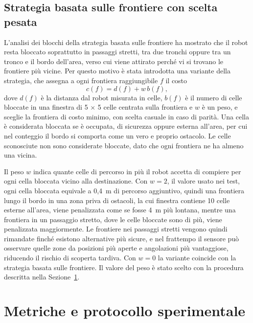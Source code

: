\subsection{Strategia basata sulle frontiere con scelta pesata}
\label{sec:pesata}

L'analisi dei blocchi della strategia basata sulle frontiere ha mostrato che il robot resta bloccato soprattutto in passaggi stretti, tra due tronchi oppure tra un tronco e il bordo dell'area, verso cui viene attirato perché vi si trovano le frontiere più vicine. Per questo motivo è stata introdotta una variante della strategia, che assegna a ogni frontiera raggiungibile $f$ il costo
\begin{equation}
    c(f) = d(f) + w \, b(f),
    \label{eq:costo}
\end{equation}
dove $d(f)$ è la distanza dal robot misurata in celle, $b(f)$ è il numero di celle bloccate in una finestra di 5 $\times$ 5 celle centrata sulla frontiera e $w$ è un peso, e sceglie la frontiera di costo minimo, con scelta casuale in caso di parità. Una cella è considerata bloccata se è occupata, di sicurezza oppure esterna all'area, per cui nel conteggio il bordo si comporta come un vero e proprio ostacolo. Le celle sconosciute non sono considerate bloccate, dato che ogni frontiera ne ha almeno una vicina.

Il peso $w$ indica quante celle di percorso in più il robot accetta di compiere per ogni cella bloccata vicino alla destinazione. Con $w = 2$, il valore usato nei test, ogni cella bloccata equivale a 0,4~m di percorso aggiuntivo, quindi una frontiera lungo il bordo in una zona priva di ostacoli, la cui finestra contiene 10 celle esterne all'area, viene penalizzata come se fosse 4~m più lontana, mentre una frontiera in un passaggio stretto, dove le celle bloccate sono di più, viene penalizzata maggiormente. Le frontiere nei passaggi stretti vengono quindi rimandate finché esistono alternative più sicure, e nel frattempo il sensore può osservare quelle zone da posizioni più aperte e angolazioni più vantaggiose, riducendo il rischio di scoperta tardiva. Con $w = 0$ la variante coincide con la strategia basata sulle frontiere. Il valore del peso è stato scelto con la procedura descritta nella Sezione~\ref{sec:protocollo}.

\section{Metriche e protocollo sperimentale}
\label{sec:protocollo}

